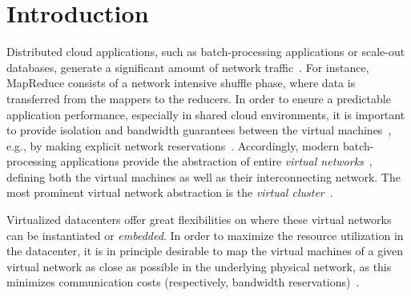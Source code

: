 \documentclass[preprint,12pt]{elsarticle}
\begin{document}
%

\section{Introduction}


Distributed cloud applications, such as batch-processing applications or scale-out databases, generate a significant amount of network traffic~\cite{talk-about}.
For instance, MapReduce consists of a network intensive shuffle phase,
where data is transferred from the mappers to the reducers.
In order to ensure a predictable application performance, especially in shared cloud environments,
it is important to provide isolation and bandwidth guarantees between the virtual machines~\cite{amazonbw},
e.g., by making explicit network reservations~\cite{oktopus}.
Accordingly, modern batch-processing applications provide the abstraction of entire \emph{virtual networks}~\cite{talk-about},
defining both the virtual machines
as well as their interconnecting network. The most prominent virtual network abstraction is the \emph{virtual cluster}~\cite{oktopus,infocom16,ccr15emb,proteus}.

Virtualized datacenters
offer great flexibilities on where these virtual networks
can be instantiated or \emph{embedded}.
In order to maximize the resource utilization in the datacenter, it is in principle desirable to
map the virtual machines of a given virtual network as close as possible
in the underlying physical network, as this minimizes communication costs (respectively, bandwidth reservations)~\cite{oktopus,infocom16,ccr15emb,proteus}.
\end{document}
